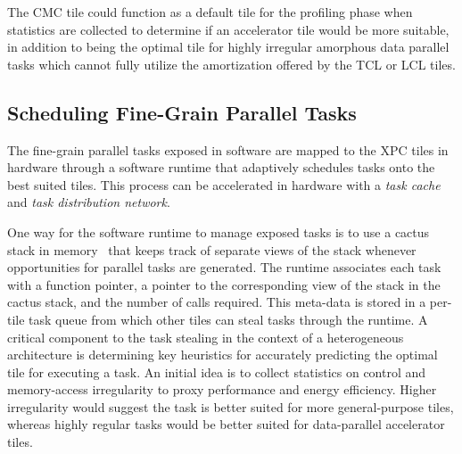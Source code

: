The CMC tile could function as a default tile for the profiling phase
when statistics are collected to determine if an accelerator tile would be
more suitable, in addition to being the optimal tile for highly irregular
amorphous data parallel tasks which cannot fully utilize the amortization
offered by the TCL or LCL tiles.

\subsection{Scheduling Fine-Grain Parallel Tasks}

\begin{figure}
  \begin{minipage}[b]{0.53\tw}
    
  \end{minipage}%
  \hfill%
  \begin{minipage}[b]{0.45\tw}
    
  \end{minipage}
\end{figure}

The fine-grain parallel tasks exposed in software are mapped to the XPC
tiles in hardware through a software runtime that adaptively schedules
tasks onto the best suited tiles. This process can be accelerated in
hardware with a \emph{task cache} and \emph{task distribution network}.

One way for the software runtime to manage exposed tasks is to use a
cactus stack in memory~\cite{frigo-hyperobjects-spaa2009} that keeps
track of separate views of the stack whenever opportunities for parallel
tasks are generated. The runtime associates each task with a function
pointer, a pointer to the corresponding view of the stack in
the cactus stack, and the number of calls required. This meta-data is
stored in a per-tile task queue from which other tiles can steal tasks
through the runtime. A critical component to the task stealing in the
context of a heterogeneous architecture is determining key heuristics
for accurately predicting the optimal tile for executing a task. An
initial idea is to collect statistics on control and memory-access
irregularity to proxy performance and energy efficiency. Higher
irregularity would suggest the task is better suited for more
general-purpose tiles, whereas highly regular tasks would be better
suited for data-parallel accelerator tiles.

